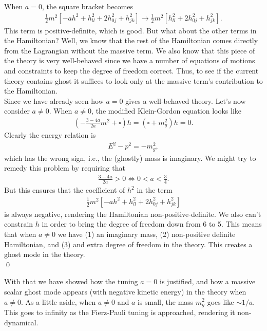 \documentclass{book}
\theoremstyle{definition}
\newcommand{\f}[2]{\frac{#1}{#2}}
\newcommand{\lp}{\left(}
\newcommand{\rp}{\right)}
\begin{document}
When $a=0$, the square bracket becomes
\begin{align}
\f{1}{2}m^2[-ah^2 + h^2_{ll} + 2h_{0j}^2 + h^2_{jk}] \to \f{1}{2}m^2[h^2_{ll} + 2h_{0j}^2 + h^2_{jk}].
\end{align}
This term is positive-definite, which is good. But what about the other terms in the Hamiltonian? Well, we know that the rest of the Hamiltonian comes directly from the Lagrangian without the massive term. We also know that this piece of the theory is very well-behaved since we have a number of equations of motions and constraints to keep the degree of freedom correct. Thus, to see if the current theory contains ghost it suffices to look only at the massive term's contribution to the Hamiltonian. \\

Since we have already seen how $a= 0$ gives a well-behaved theory. Let's now consider $a\neq 0$. When $a\neq 0$, the modified Klein-Gordon equation looks like
\begin{align}
\lp -\f{3-4a}{2a}m^2 + \square\rp h = (\square + m_g^2)h = 0. 
\end{align}
Clearly the energy relation is 
\begin{align}
E^2 - p^2 = -m_g^2,
\end{align}
which has the wrong sign, i.e., the (ghostly) mass is imaginary. We might try to remedy this problem by requiring that
\begin{align}
\f{3-4a}{2a} > 0 \iff 0 < a < \f{3}{4}.
\end{align}
But this ensures that the coefficient of $h^2$ in the term
\begin{align}
\f{1}{2}m^2[-ah^2 + h^2_{ll} + 2h_{0j}^2 + h^2_{jk}]
\end{align}
is always negative, rendering the Hamiltonian non-positive-definite. We also can't constrain $h$ in order to bring the degree of freedom down from 6 to 5. This means that when $a\neq 0$ we have (1) an imaginary mass, (2) non-positive definite Hamiltonian, and (3) and extra degree of freedom in the theory. This creates a ghost mode in the theory.\\ \qed

With that we have showed how the tuning $a = 0$ is justified, and how a massive scalar ghost mode appears (with negative kinetic energy) in the theory when $a \neq 0$. As a little aside, when $a\neq0$ and $a$ is small, the mass $m_g^2$ goes like $\sim 1/a$. This goes to infinity as the Fierz-Pauli tuning is approached, rendering it non-dynamical.
\end{document}
